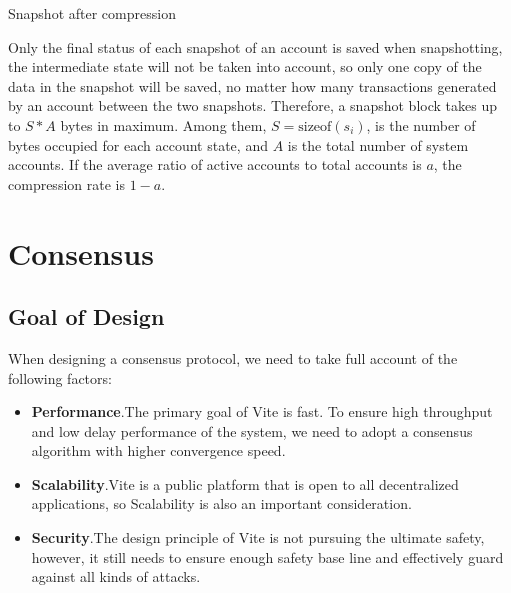 \documentclass[UTF8,nofonts]{article}
\makeatletter
\newenvironment{figurehere}
 {\def\@captype{figure}}
 {}
\makeatother
\begin{document}
\begin{multicols}{2}
\begin{center}
\begin{figurehere}

\caption{Snapshot after compression}
\label{fig:compact-snapshot}
\end{figurehere}
\end{center}

Only the final status of each snapshot of an account is saved when snapshotting, the intermediate state will not be taken into account, so only one copy of the data in the snapshot will be saved, no matter how many transactions generated by an account between the two snapshots. Therefore, a snapshot block takes up to $S * A$ bytes in maximum. Among them, $S = \text{sizeof}(s_{i})$, is the number of bytes occupied for each account state, and $A$ is the total number of system accounts. If the average ratio of active accounts to total accounts is $a$, the compression rate is $1-a$.

\section{Consensus}
\subsection{Goal of Design}
When designing a consensus protocol, we need to take full account of the following factors:
\begin{itemize}
	\item \textbf{Performance}.The primary goal of Vite is fast. To ensure high throughput and low delay performance of the system, we need to adopt a consensus algorithm with higher convergence speed.
	\item \textbf{Scalability}.Vite is a public platform that is open to all decentralized applications, so Scalability is also an important consideration.
	\item \textbf{Security}.The design principle of Vite is not pursuing the ultimate safety, however, it still needs to ensure enough safety base line and effectively guard against all kinds of attacks.
\end{itemize}


\end{multicols}
\end{document}
